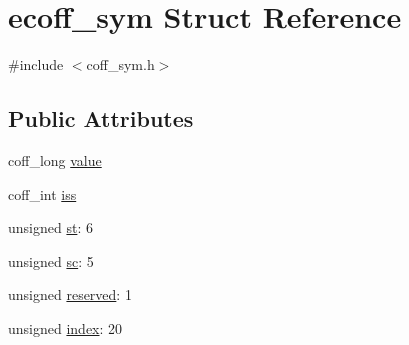 \hypertarget{structecoff__sym}{
\section{ecoff\_\-sym Struct Reference}
\label{structecoff__sym}
}


{\ttfamily \#include $<$coff\_\-sym.h$>$}

\subsection*{Public Attributes}
\begin{DoxyCompactItemize}
\item 
coff\_\-long \hyperlink{structecoff__sym_a29ad6f5c1882fa45e38611590fc39b86}{value}
\item 
coff\_\-int \hyperlink{structecoff__sym_a84e2f0ffef18d414f63742dc0f7c34bf}{iss}
\item 
unsigned \hyperlink{structecoff__sym_a0ff7a57359cca8c3b5cb1ce1562c8fb5}{st}: 6
\item 
unsigned \hyperlink{structecoff__sym_ac665cb20549d0a79d2c7bd5e0d659e41}{sc}: 5
\item 
unsigned \hyperlink{structecoff__sym_a1e46d0ed7bc76ecc0faf584d88d0ab74}{reserved}: 1
\item 
unsigned \hyperlink{structecoff__sym_aec47fca2d8f69799980da61d442414f0}{index}: 20
\end{DoxyCompactItemize}


